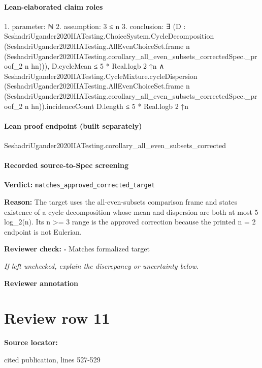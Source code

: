 \documentclass[10pt]{article}
\newcommand{\reviewerbox}{%
  \par\noindent\fbox{\parbox{0.96\linewidth}{\rule{0pt}{0.38in}}}\par
}
\newcommand{\reviewmatch}[1]{%
  \par\noindent\textbf{Reviewer check:} $\square$\; #1\par
  \noindent\emph{If left unchecked, explain the discrepancy or uncertainty below.}\par
}
\begin{document}
\paragraph{Lean-elaborated claim roles}\begin{ReviewVerbatim}
1. parameter: ℕ
2. assumption: 3 ≤ n
3. conclusion: ∃ (D :
  SeshadriUgander2020IIATesting.ChoiceSystem.CycleDecomposition
    (SeshadriUgander2020IIATesting.AllEvenChoiceSet.frame n
      (SeshadriUgander2020IIATesting.corollary_all_even_subsets_correctedSpec._proof_2 n hn))),
  D.cycleMean ≤ 5 * Real.logb 2 ↑n ∧
    SeshadriUgander2020IIATesting.CycleMixture.cycleDispersion
        (SeshadriUgander2020IIATesting.AllEvenChoiceSet.frame n
            (SeshadriUgander2020IIATesting.corollary_all_even_subsets_correctedSpec._proof_2 n hn)).incidenceCount
        D.length ≤
      5 * Real.logb 2 ↑n
\end{ReviewVerbatim}

\paragraph{Lean proof endpoint (built separately)}\begin{ReviewVerbatim}
SeshadriUgander2020IIATesting.corollary_all_even_subsets_corrected
\end{ReviewVerbatim}

\paragraph{Recorded source-to-Spec screening}
\textbf{Verdict:} \texttt{matches\_approved\_corrected\_target}
\\
{\raggedright
\textbf{Reason:} The target uses the all-\allowbreak{}even-\allowbreak{}subsets comparison frame and states existence of a cycle decomposition whose mean and dispersion are both at most 5 log\_\allowbreak{}2(n).\allowbreak{} Its n >= 3 range is the approved correction because the printed n = 2 endpoint is not Eulerian.\allowbreak{}
\par}
\reviewmatch{Matches formalized target}
\noindent\textbf{Reviewer annotation}\par
\reviewerbox
\clearpage
\hypertarget{source-claim-c2aa7e7aff10bcc2}{}
\section*{Review row 11}
\textbf{Source locator:} {\footnotesize\raggedright cited publication, lines 527-\allowbreak{}529\par}
\end{document}
